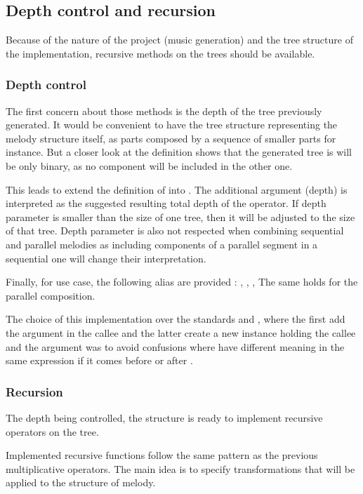 \documentclass[preprint]{sigplanconf}
\begin{document}
\subsection{Depth control and recursion}

Because of the nature of the project (music generation) and the tree structure of the implementation, recursive methods on the trees should be available.

\subsubsection{Depth control}

The first concern about those methods is the depth of the tree previously generated. It would be convenient to have the tree structure representing the melody structure itself, as parts composed by a sequence of smaller parts for instance. But a closer look at the \lln{+} definition shows that the generated tree is will be only binary, as no component will be included in the other one.

This leads to extend the definition of  into . The additional argument (depth) is interpreted as the suggested resulting total depth of the operator. If depth parameter is smaller than the size of one tree, then it will be adjusted to the size of that tree. Depth parameter is also not respected when combining sequential and parallel melodies as including components of a parallel segment in a sequential one will change their interpretation. 

Finally, for use case, the following alias are provided :
, , , 
The same holds for the parallel composition.

The choice of this implementation over the standards \lln{+} and \lln{++}, where the first add the argument in the callee and the latter create a new instance holding the callee and the argument was to avoid confusions where \lln{+} have different meaning in the same expression if it comes before or after \lln{++}.

\subsubsection{Recursion}

The depth being controlled, the structure is ready to implement recursive operators on the tree.

Implemented recursive functions follow the same pattern as the previous multiplicative operators. The main idea is to specify transformations that will be applied to the structure of melody.
\end{document}

